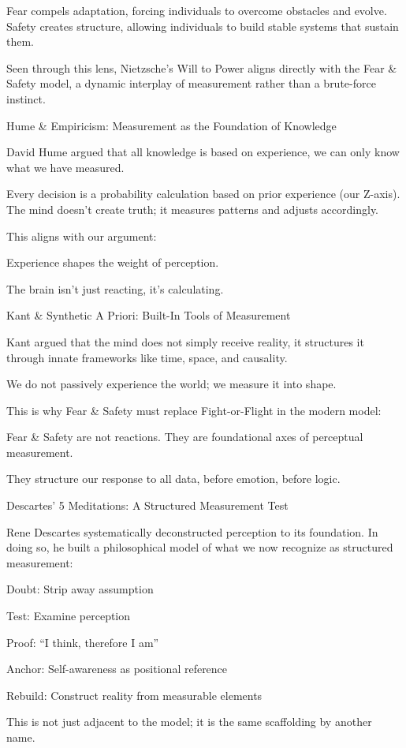 \documentclass[11pt]{article}
\begin{document}
Fear compels adaptation, forcing individuals to overcome obstacles and evolve.
Safety creates structure, allowing individuals to build stable systems that sustain them.

Seen through this lens, Nietzsche’s Will to Power aligns directly with the Fear & Safety model, 
a dynamic interplay of measurement rather than a brute-force instinct.

Hume & Empiricism: Measurement as the Foundation of Knowledge

David Hume argued that all knowledge is based on experience, we can only know what we have measured.

Every decision is a probability calculation based on prior experience (our Z-axis).
The mind doesn’t create truth; it measures patterns and adjusts accordingly.

This aligns with our argument:

Experience shapes the weight of perception.

The brain isn’t just reacting, it’s calculating.

Kant & Synthetic A Priori: Built-In Tools of Measurement

Kant argued that the mind does not simply receive reality, it structures it through innate frameworks like time, space, and causality.

We do not passively experience the world; we measure it into shape.

This is why Fear & Safety must replace Fight-or-Flight in the modern model:

Fear & Safety are not reactions. They are foundational axes of perceptual measurement.

They structure our response to all data, before emotion, before logic.

Descartes’ 5 Meditations: A Structured Measurement Test

Rene Descartes systematically deconstructed perception to its foundation. In doing so, he built a philosophical model of what we now recognize as structured measurement:

Doubt: Strip away assumption

Test: Examine perception

Proof: “I think, therefore I am”

Anchor: Self-awareness as positional reference

Rebuild: Construct reality from measurable elements

This is not just adjacent to the model; it is the same scaffolding by another name.
\end{document}
